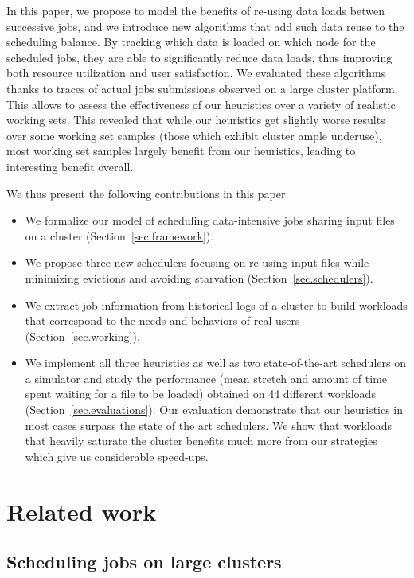 \documentclass[conference,10pt]{IEEEtran}
\begin{document}
In this paper, we propose to model the benefits of re-using data loads
betwen successive jobs, and we introduce new algorithms that add such
data reuse to the scheduling balance. By tracking which data is loaded
on which node for the scheduled jobs, they are able to significantly
reduce data loads, thus improving both resource utilization and user
satisfaction. We evaluated these algorithms thanks to traces of actual
jobs submissions observed on a large cluster platform. This allows to
assess the effectiveness of our heuristics over a variety of realistic
working sets. This revealed that while our heuristics get slightly worse
results over some working set samples (those which exhibit cluster ample
underuse), most working set samples largely benefit from our heuristics,
leading to interesting benefit overall.

We thus present the following contributions in this paper:
\begin{itemize}
	\item We formalize our model of scheduling data-intensive jobs sharing input files on a cluster (Section~\ref{sec.framework}).
	\item We propose three new schedulers focusing on re-using input files while minimizing evictions and avoiding starvation (Section~\ref{sec.schedulers}).
	\item We extract job information from historical logs of a cluster to build workloads that correspond to the needs and behaviors of real users (Section~\ref{sec.working}).
	\item We implement all three heuristics as well as two state-of-the-art schedulers on a simulator and study the performance (mean stretch and amount of time spent waiting for a file to be loaded) obtained on 44 different workloads (Section~\ref{sec.evaluations}).
	Our evaluation demonstrate that our heuristics in most cases surpass the state of the art schedulers.
	We show that workloads that heavily saturate the cluster
                benefits much more from our strategies which give us
                considerable speed-ups.
\end{itemize}

\section{Related work}\label{sec.related_work}

\subsection{Scheduling jobs on large clusters}
\end{document}
